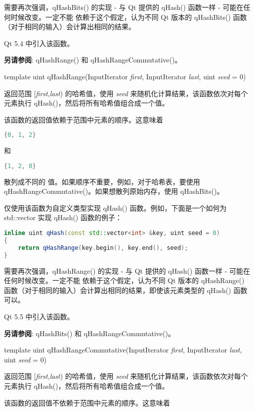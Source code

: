 需要再次强调，qHashBits() 的实现 - 与 Qt 提供的 qHash() 函数一样 - 可能在任何时候改变。一定不能 依赖于这个假定，认为不同 Qt 版本的 qHashBits() 函数（对于相同的输入）会计算出相同的结果。

Qt 5.4 中引入该函数。

\textbf{另请参阅}: qHashRange() 和 qHashRangeCommutative()。

template uint qHashRange(InputIterator \emph{first}, InputIterator \emph{last}, uint \emph{seed} = 0)

返回范围 [\emph{first},\emph{last}) 的哈希值，使用 \emph{seed} 来随机化计算结果，该函数依次对每个元素执行 qHash()，然后将所有哈希值组合成一个值。

该函数的返回值依赖于范围中元素的顺序。这意味着

\begin{lstlisting}[language=C++]
{0, 1, 2}
\end{lstlisting}

和

\begin{lstlisting}[language=C++]
{1, 2, 0}
\end{lstlisting}

散列成不同的 值。如果顺序不重要，例如，对于哈希表，要使用 qHashRangeCommutative()。如果想散列原始内存，使用 qHashBits()。

仅使用该函数为自定义类型实现 qHash() 函数。例如，下面是一个如何为
std::vector 实现 qHash() 函数的例子：

\begin{lstlisting}[language=C++]
inline uint qHash(const std::vector<int> &key, uint seed = 0)
{
    return qHashRange(key.begin(), key.end(), seed);
}
\end{lstlisting}

需要再次强调，qHashRange() 的实现 - 与 Qt 提供的 qHash() 函数一样 - 可能在任何时候改变。一定不能 依赖于这个假定，认为不同 Qt 版本的 qHashRange() 函数（对于相同的输入）会计算出相同的结果，即使该元素类型的 qHash() 函数可以。

Qt 5.5 中引入该函数。

\textbf{另请参阅}: qHashBits() 和 qHashRangeCommutative()。

template uint qHashRangeCommutative(InputIterator \emph{first}, InputIterator \emph{last}, uint \emph{seed} = 0)

返回范围 [\emph{first},\emph{last}) 的哈希值，使用 \emph{seed} 来随机化计算结果，该函数依次对每个元素执行 qHash()，然后将所有哈希值组合成一个值。

该函数的返回值不依赖于范围中元素的顺序。这意味着

